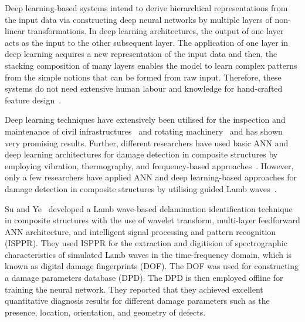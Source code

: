 Deep learning-based systems intend to derive hierarchical representations
from the input data via constructing deep neural networks by multiple layers
of non-linear transformations.
In deep learning architectures, the output of one layer acts as the input to the other subsequent layer.
The application of one layer in deep learning acquires a new representation of the input data and then, the stacking composition of many layers enables the model to learn complex patterns from the simple notions that can be formed from raw input.
Therefore, these systems do not need extensive human labour and knowledge for hand-crafted feature design~\cite{zhao2019deep, yuan2020machine}.

Deep learning techniques have extensively been utilised for the inspection and
maintenance of civil infrastructures~\cite{cha2017deep, lin2017structural, liu2019computer} and rotating machinery~\cite{janssens2016convolutional, jia2016deep} and has shown very promising results.
Further, different researchers have used basic ANN and deep learning architectures for damage detection in composite structures by employing vibration, thermography, and frequency-based approaches~\cite{islam1994damage, okafor1996delamination, chakraborty2005artificial, khan2019structural, luo2019temporal, bang2020defect}. 
However, only a few researchers have applied ANN and deep learning-based approaches for damage detection in composite structures by utilising guided Lamb waves~\cite{su2004lamb, chetwynd2008damage, de2015application, feng2019locating, mardanshahi2020detection, qian2020application, tabian2019convolutional, rautela2021ultrasonic}.

Su and Ye~\cite{su2004lamb} developed a Lamb wave-based delamination identification technique in composite structures with the use of wavelet transform, multi-layer feedforward ANN architecture, and intelligent signal processing and pattern recognition (ISPPR).
They used ISPPR for the extraction and digitision of spectrographic characteristics of simulated Lamb waves in the time-frequency domain, which is known as digital damage fingerprints (DOF).
The DOF was used for constructing a damage parameters database (DPD). 
The DPD is then employed offline for training the neural network.  
They reported that they achieved excellent quantitative diagnosis results for different damage parameters such as the presence, location, orientation, and geometry of defects.

